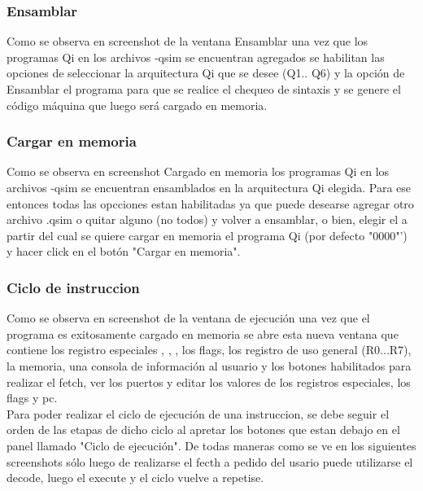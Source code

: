\subsubsection{Ensamblar}
Como se observa en screenshot de la ventana Ensamblar una vez que los programas Qi en los archivos -qsim se encuentran agregados se habilitan las opciones de seleccionar la arquitectura Qi que se desee (Q1.. Q6) y la opción de Ensamblar el programa para que se realice el chequeo de sintaxis y se genere el código máquina que luego será cargado en memoria.


\subsubsection{Cargar en memoria}
Como se observa en screenshot Cargado en memoria los programas Qi en los archivos -qsim se encuentran ensamblados en la arquitectura Qi elegida.
Para ese entonces todas las opcciones estan habilitadas ya que puede desearse agregar otro archivo .qsim o quitar alguno (no todos) y volver a ensamblar, o bien, elegir el \PC a partir del cual se quiere cargar en memoria el programa Qi (por defecto "0000"') y hacer click en el botón "Cargar en memoria".

\subsubsection{Ciclo de instruccion}
Como se observa en screenshot de la ventana de ejecución una vez que el programa es exitosamente cargado en memoria se abre esta nueva ventana que contiene los registro especiales \PC, \IR, \SP, los flags, los registro de uso general (R0...R7), la memoria, una consola de información al usuario y los botones habilitados para realizar el fetch, ver los puertos y editar los valores de los registros especiales, los flags y pc.
\\
Para poder realizar el ciclo de ejecución de una instruccion, se debe seguir el orden de las etapas de dicho ciclo al apretar los botones que estan debajo en el panel llamado "Ciclo de ejecución". De todas maneras como se ve en los siguientes screenshots sólo luego de realizarse el fecth a pedido del usario puede utilizarse el decode, luego el execute y el ciclo vuelve a repetise.\\

\\
\\
\\

